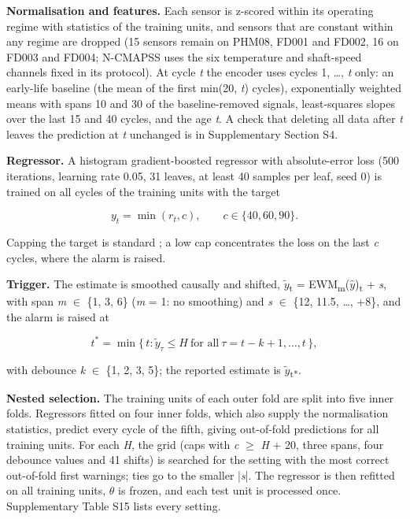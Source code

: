 \documentclass[a4paper,fleqn,doubleblind]{cas-dc}
\begin{document}
\textbf{Normalisation and features.} Each sensor is z-scored within its operating regime with statistics of the training units, and sensors that are constant within any regime are dropped (15 sensors remain on PHM08, FD001 and FD002, 16 on FD003 and FD004; N-CMAPSS uses the six temperature and shaft-speed channels fixed in its protocol). At cycle \textit{t} the encoder uses cycles 1, \ldots{}, \textit{t} only: an early-life baseline (the mean of the first min(20, \textit{t}) cycles), exponentially weighted means with spans 10 and 30 of the baseline-removed signals, least-squares slopes over the last 15 and 40 cycles, and the age \textit{t}. A check that deleting all data after \textit{t} leaves the prediction at \textit{t} unchanged is in Supplementary Section S4.

\textbf{Regressor.} A histogram gradient-boosted regressor \cite{pedregosa2011} with absolute-error loss (500 iterations, learning rate 0.05, 31 leaves, at least 40 samples per leaf, seed 0) is trained on all cycles of the training units with the target

\begin{equation}
y_t = \min( r_t, c ), \qquad c \in \{40, 60, 90\}.
\end{equation}

Capping the target is standard \cite{heimes2008}; a low cap concentrates the loss on the last \textit{c} cycles, where the alarm is raised.

\textbf{Trigger.} The estimate is smoothed causally and shifted, $\tilde{y}$\textsubscript{t} = EWM\textsubscript{m}($\hat{y}$)\textsubscript{t} + \textit{s}, with span \textit{m} $\in$ \{1, 3, 6\} (\textit{m} = 1: no smoothing) and \textit{s} $\in$ \{\textminus{}12, \textminus{}11.5, \ldots{}, +8\}, and the alarm is raised at

\begin{equation}
t^{*} = \min\{\, t : \tilde{y}_{\tau} \le H \ \text{for all}\ \tau = t-k+1, \ldots, t \,\},
\end{equation}

with debounce \textit{k} $\in$ \{1, 2, 3, 5\}; the reported estimate is $\tilde{y}$\textsubscript{t*}.

\textbf{Nested selection.} The training units of each outer fold are split into five inner folds. Regressors fitted on four inner folds, which also supply the normalisation statistics, predict every cycle of the fifth, giving out-of-fold predictions for all training units. For each \textit{H}, the grid (caps with \textit{c} $\ge$ \textit{H} + 20, three spans, four debounce values and 41 shifts) is searched for the setting with the most correct out-of-fold first warnings; ties go to the smaller |\textit{s}|. The regressor is then refitted on all training units, $\theta$ is frozen, and each test unit is processed once. Supplementary Table S15 lists every setting.
\end{document}
